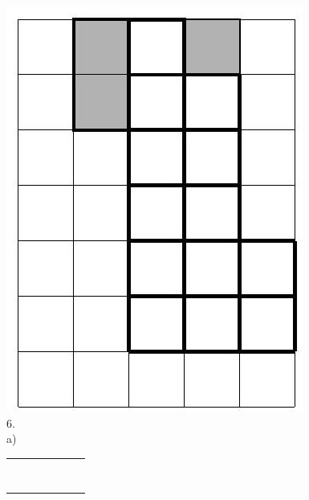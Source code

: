 \documentclass[10pt]{article}
\begin{document}
\includegraphics[max width=\textwidth, center]{2024_11_21_e9b4faa005d5be2cc318g-159(2)}\\
6.\\
a)

\begin{center}
\begin{tabular}{|l|l|l|l|l|l|l|}
\hline
 &  &  &  &  &  &  \\
\hline
 &  &  &  &  &  &  \\
\hline
 &  &  &  &  &  &  \\
\hline
 &  &  &  &  &  &  \\
\hline
 &  &  &  &  &  &  \\
\hline
 &  &  &  &  &  &  \\
\hline
 &  &  &  &  &  &  \\
\hline
 &  &  &  &  &  &  \\
\hline
 &  &  &  &  &  &  \\
\hline
\end{tabular}
\end{center}
\end{document}
